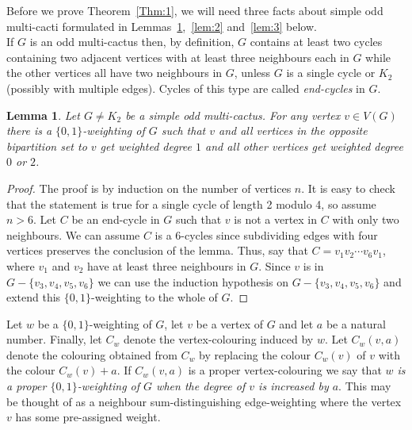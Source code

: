 \documentclass[
final,
 nomarks,
]{dmtcs-episciences}
\newtheorem{lemma}[theorem]{Lemma}
\theoremstyle{definition}
\begin{document}
\noindent Before we prove Theorem~\ref{Thm:1}, we will need three facts about simple odd multi-cacti formulated in Lemmas~\ref{lem:1},~\ref{lem:2} and~\ref{lem:3} below. \\
If $G$ is an odd multi-cactus then, by definition, $G$ contains at least two cycles containing two adjacent vertices with at least three neighbours each in $G$ while the other vertices all have two neighbours in $G$, unless $G$ is a single cycle or $K_2$ (possibly with multiple edges). Cycles of this type are called \textit{end-cycles} in $G$.  
\begin{lemma} \label{lem:1}
Let $G \neq K_2$ be a simple odd multi-cactus. For any vertex $v \in V(G)$ there is a $\{0,1\}$-weighting of $G$ such that $v$ and all vertices in the opposite bipartition set to $v$ get weighted degree $1$ and all other vertices get weighted degree $0$ or $2$.
\end{lemma}
\begin{proof}
The proof is by induction on the number of vertices $n$. It is easy to check that the statement is true for a single cycle of length 2 modulo 4, so assume $n>6$. Let $C$ be an end-cycle in $G$ such that $v$ is not a vertex in $C$ with only two neighbours. We can assume $C$ is a 6-cycles since subdividing edges with four vertices preserves the conclusion of the lemma. Thus, say that $C=v_1v_2 \cdots v_6v_1$, where $v_1$ and $v_2$ have at least three neighbours in $G$. Since $v$ is in $G-\{v_3,v_4,v_5,v_6\}$ we can use the induction hypothesis on $G- \{v_3, v_4, v_5, v_6\}$ and extend this $\{0,1\}$-weighting to the whole of $G$. 
\end{proof}

\noindent Let $w$ be a $\{0,1\}$-weighting of $G$, let $v$ be a vertex of $G$ and let $a$ be a natural number. Finally, let $C_w$ denote the vertex-colouring induced by $w$. Let $C_w(v,a)$ denote the colouring obtained from $C_w$ by replacing the colour $C_w(v)$ of $v$ with the colour $C_w(v)+a$. If $C_w(v,a)$ is a proper vertex-colouring we say that \textit{$w$ is a proper $\{0,1\}$-weighting of $G$ when the degree of $v$ is increased by $a$}. This may be thought of as a neighbour sum-distinguishing edge-weighting where the vertex $v$ has some pre-assigned weight.
\end{document}

